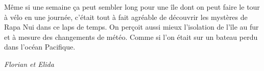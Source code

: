 Même si une semaine ça peut sembler long pour une île dont on peut faire
le tour à vélo en une journée, c'était tout à fait agréable de découvrir
les mystères de Rapa Nui dans ce laps de temps. On perçoit aussi mieux
l'isolation de l'île au fur et à mesure des changements de météo. Comme
si l'on était sur un bateau perdu dans l'océan Pacifique.

\emph{Florian et Elida}
